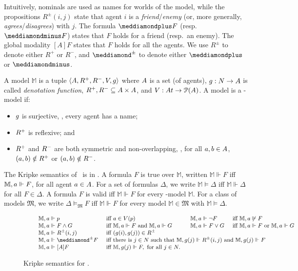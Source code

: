 Intuitively, nominals are used as names for worlds of the model, while the propositions $R^\pm(i,j)$ state that agent $i$ is a  \emph{friend}/\emph{enemy} (or, more generally, \emph{agrees}/\emph{disagrees}) with
 $j$. 
The formula $\dplus F $ (resp. $\dminus F $) states that $F $ holds for  a friend (resp.\ an enemy). The global
modality $[A]F $ states that $F $ holds for all the agents. 
We use $R^\pm$ to denote either $R^+$ or $R^-$, and 
 $\dplusminus$ to denote either $\dplus$ or $\dminus$. 

A model $\mathbb{M}$ is a tuple $\langle \A,\R^+,\R^-,\V,\g\rangle$ where $\A$
is a set (of agents), $\g:N\rightarrow \A$ is called \emph{denotation
function}, $\R^+,\R^-\subseteq \A\times \A$, and $\V:\At\rightarrow
\mathcal{P}(\A)$. 
%
A model is a \PNL-model if:
\begin{itemize}
\item $\g$ is surjective, \ie, every agent has a name;
\item $\R^+$ is reflexive; and
\item $\R^+$ and $\R^-$ are both symmetric and 
non-overlapping, \ie,  for all $\ag,\b\in \A$, $(\ag,\b)\notin \R^+$ or $(\ag,\b)\notin \R^-$. 
\end{itemize}  
The Kripke semantics of \PNL~is in .
A formula $F$ is true over $\mathbb{M}$, written $\mathbb{M}\Vdash F$ iff
$\mathbb{M},\ag\Vdash F$, for all agent $\ag\in\A$. For a set of formulas
$\Delta$, we write $\mathbb{M}\models \Delta$ iff $\mathbb{M}\Vdash \Delta$ for all $F
\in \Delta$. A formula $F$ is valid iff $\mathbb{M}\Vdash F$ for every
\PNL-model $\mathbb{M}$. For a class of models $\mathfrak{M}$, we write
$\Delta\models_{\mathfrak{M}} F$ iff $\mathbb{M}\Vdash F$ for every model
$\mathbb{M}\in \mathfrak{M}$ with $\mathbb{M}\models \Delta$. 


\begin{figure}
$\small
\qquad\begin{array}{lll l lll}
    \mathbb{M},\ag \Vdash p &\text{ iff } \ag\in \V(p) &\quad& 
    \mathbb{M},\ag \Vdash \neg F &\text{ iff } \mathbb{M},\ag \not \Vdash F\\
    \mathbb{M},\ag \Vdash F \wedge G &\text{ iff } \mathbb{M},\ag \Vdash F \text{ and } \mathbb{M},\ag \Vdash G &\quad&
    \mathbb{M},\ag \Vdash F \vee G &\text{ iff } \mathbb{M},\ag \Vdash F \text{ or } \mathbb{M},\ag \Vdash G\\
    \mathbb{M},\ag \Vdash R^\pm(i,j) &\text{ iff } (\g(i),\g(j))\in \R^\pm\\
    \mathbb{M},\ag \Vdash \dplusminus F &\multicolumn{6}{l}{\text{ iff there is } j\in N \text{ such that } \mathbb{M},\g(j)\Vdash R^{\pm}(i,j)  \text{ and } \mathbb{M},\g(j)\Vdash  F }\\
    \mathbb{M},\ag \Vdash [A] F  &\multicolumn{6}{l}{\text{ iff } \mathbb{M},\g(j)\Vdash  F , \text{ for all } j\in N.}
\end{array}
$
\caption{Kripke semantics for \PNL\label{fig:ksem}.}
\end{figure}


